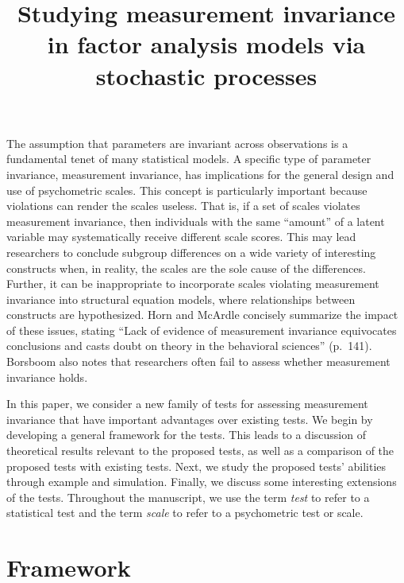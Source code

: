 \documentclass[man]{apa}
\title{Studying measurement invariance in factor analysis models
  via stochastic processes}
\begin{document}
\maketitle

The assumption that parameters are
invariant across observations is a
fundamental tenet of many statistical models.  A specific type of 
parameter invariance, measurement invariance, has implications for the
general design and use of psychometric scales.
This concept is 
particularly important because violations can render the scales
useless.  
That is, if a set of scales violates measurement invariance,
then individuals with the same ``amount'' of a latent variable 
may systematically receive 
different scale scores.
This may lead researchers to conclude subgroup
differences on a wide variety of interesting constructs 
when, in reality, the scales are the sole cause of the 
differences.  Further, it can be inappropriate to incorporate scales
violating measurement invariance into structural equation
models, where relationships between constructs are hypothesized.  Horn
and McArdle \citeyear{HorMca92} concisely summarize the impact of
these issues, stating ``Lack of evidence of measurement 
invariance equivocates conclusions and casts doubt on theory in the
behavioral sciences'' (p.\ 141).  Borsboom \citeyear{Bor06a} also
notes that researchers often fail to assess whether measurement
invariance holds.

In this paper, we consider a new family of tests for assessing
measurement invariance that have important advantages over existing
tests.  We begin by developing a general framework for the tests.
This leads to a discussion of theoretical results relevant to the
proposed tests, as well as a comparison of the proposed tests with
existing tests.  Next,
we study the 
proposed tests' abilities through example and simulation.  Finally,
we discuss some interesting extensions of the tests.
Throughout the manuscript, we use the term {\em{test}} to refer to a
statistical test and the term {\em{scale}} to refer to a psychometric 
test or scale.

\section{Framework}
\end{document}
